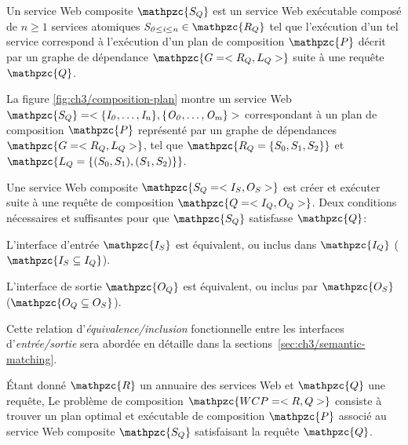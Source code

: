 \begin{mydef}
  Un service Web composite $\mathpzc{S_Q}$ est un service Web
  exécutable composé de $n \geq 1$ services atomiques
  $\mathit{S_{0 \leq i \leq n}} \in \mathpzc{R_Q}$ tel que l'exécution
  d'un tel service correspond à l'exécution d'un plan de composition
  $\mathpzc{P}$ décrit par un graphe de dépendance
  $\mathpzc{G = <R_Q,L_Q>}$ suite à une requête $\mathpzc{Q}$.\medskip
\end{mydef}

La figure \ref{fig:ch3/composition-plan} montre un service Web
$\mathpzc{S_Q} = <\mathit{\{I_0, \dots, I_n\}}, \mathit{\{O_0, \dots,
  O_m\}}>$
correspondant à un plan de composition $\mathpzc{P}$ représenté par un
graphe de dépendances $\mathpzc{G =<R_Q,L_Q>}$, tel que
$\mathpzc{R_Q = \{S_0, S_1, S_2\}}$ et
$\mathpzc{L_Q = \{(S_0, S_1), (S_1, S_2)\}}$.\medskip

Une service Web composite $\mathpzc{S_Q = <I_S, O_S>}$ est créer et
exécuter suite à une requête de composition $\mathpzc{Q=<I_Q, O_Q>}$.
Deux conditions nécessaires et suffisantes pour que $\mathpzc{S_Q}$
satisfasse $\mathpzc{Q}$:\medskip

\begin{enumerateRoman}
\item L'interface d'entrée $\mathpzc{I_S}$ est équivalent, ou inclus
  dans $\mathpzc{I_Q}$ ($\mathpzc{I_S \subseteq I_Q}$).

\item L'interface de sortie $\mathpzc{O_Q}$ est équivalent, ou inclus
  par $\mathpzc{O_S}$ ($\mathpzc{O_Q \subseteq O_S}$).\medskip
\end{enumerateRoman}
\enddescription

Cette relation d'\emph{équivalence/inclusion} fonctionnelle entre les
interfaces d'\emph{entrée/sortie} sera abordée en détaille dans la
sections~\ref{sec:ch3/semantic-matching}.\medskip

\begin{mydef}
  Étant donné $\mathpzc{R}$ un annuaire des services Web et
  $\mathpzc{Q}$ une requête, Le problème de composition
  $\mathpzc{WCP=<R,Q>}$ consiste à trouver un plan optimal et
  exécutable de composition $\mathpzc{P}$ associé au service Web
  composite $\mathpzc{S_Q}$ satisfaisant la requête
  $\mathpzc{Q}$.\medskip
\end{mydef}



